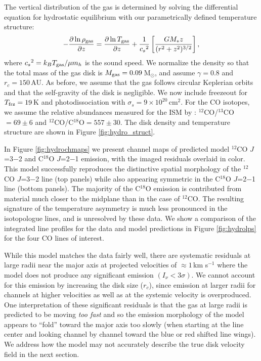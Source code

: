 The vertical distribution of the gas is determined by solving the differential 
equation for hydrostatic equilibrium with our parametrically defined temperature
structure:
\begin{equation}
-\frac{\partial \ln \rho_{\rm gas}}{\partial z} =\frac{\partial\ln T_{\rm gas}}{\partial z} + \frac{1}{{c_s}^2}\left[\frac{G M_\ast z}{(r^2 + z^2)^{3/2}}\right],
\end{equation}
where ${c_s}^2 = k_B T_{\rm gas}/\mu m_h$ is the sound speed.  We normalize the 
density so that the total mass of the gas disk is 
$M_{\rm gas} = 0.09$\,M$_\odot$, and assume $\gamma = 0.8$ and $r_c=150$\,AU.  
As before,  we assume that the gas follows circular Keplerian orbits and that the 
self-gravity of the disk is negligible.   We now include freezeout for 
$T_{\rm frz} = 19$\,K and photodissociation with 
$\sigma_s = 9\times10^{20}$\,cm$^{2}$.  For the CO isotopes, we assume the 
relative abundances measured for the ISM by \citet{wilson99}: 
$^{12}$CO/$^{13}$CO$=69\pm6$ and $^{12}$CO/C$^{18}$O$=557\pm30$.  The disk 
density and temperature structure are shown in Figure \ref{fig:hydro_struct}.

In Figure \ref{fig:hydrochmaps} we present channel maps of predicted model 
$^{12}$CO $J$=3$-$2 and C$^{18}$O $J$=2$-$1 emission, with the 
imaged residuals overlaid in color.  This model successfully reproduces the 
distinctive spatial morphology of the $^{12}$CO $J$=3$-$2 line (top panels) 
while also appearing symmetric in the C$^{18}$O $J$=2$-$1 line (bottom panels). 
The majority of the C$^{18}$O emission is contributed from material
much closer to the midplane than in the case of $^{12}$CO.  The resulting 
signature of the temperature asymmetry is much less pronounced in the 
isotopologue lines, and is unresolved by these data.  We show a comparison of 
the integrated line profiles for the data and model predictions in Figure 
\ref{fig:hydrolps} for the four CO lines of interest. 

While this model matches the data fairly well, there are systematic residuals at
large radii near the major axis at projected velocities of $\approx 1$\,km
s$^{-1}$ where the model does not produce any significant emission 
$(I_\nu < 3\sigma)$.  We cannot account for this emission by increasing the 
disk size ($r_c$), since emission at larger radii for channels at 
higher velocities as well as at the systemic velocity is overproduced.  One 
interpretation of these significant residuals is that the gas at large radii is 
predicted to be moving {\it too fast} and so the emission morphology of the 
model appears to ``fold'' toward the major axis too slowly (when starting at 
the line center and looking channel by channel toward the blue or red shifted 
line wings).  We address how the model may not accurately describe the true disk
velocity field in the next section.


